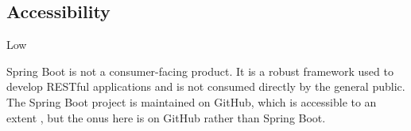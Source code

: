 \subsection*{Accessibility}

\ranking Low

Spring Boot is not a consumer-facing product. It is a robust framework used to develop RESTful applications and is not consumed directly by the general public. The Spring Boot project is maintained on GitHub, which is accessible to an extent \cite{github-accessibility}, but the onus here is on GitHub rather than Spring Boot.